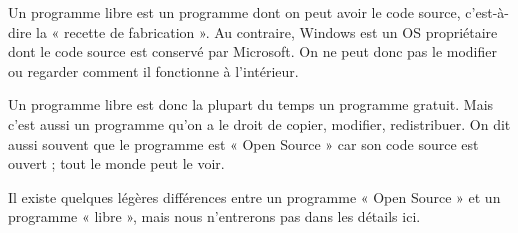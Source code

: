 \documentclass[10pt,fleqn]{article} %
\begin{document}
\begin{rem}
Un programme libre est un programme dont on peut avoir le code source, c'est-à-dire la « recette de fabrication ». Au contraire, Windows est un OS propriétaire dont le code source est conservé par Microsoft. On ne peut donc pas le modifier ou regarder comment il fonctionne à l'intérieur.

Un programme libre est donc la plupart du temps un programme gratuit. Mais c'est aussi un programme qu'on a le droit de copier, modifier, redistribuer. On dit aussi souvent que le programme est « Open Source » car son code source est ouvert ; tout le monde peut le voir.

Il existe quelques légères différences entre un programme « Open Source » et un programme « libre », mais nous n'entrerons pas dans les détails ici.
\end{rem}
\end{document}
